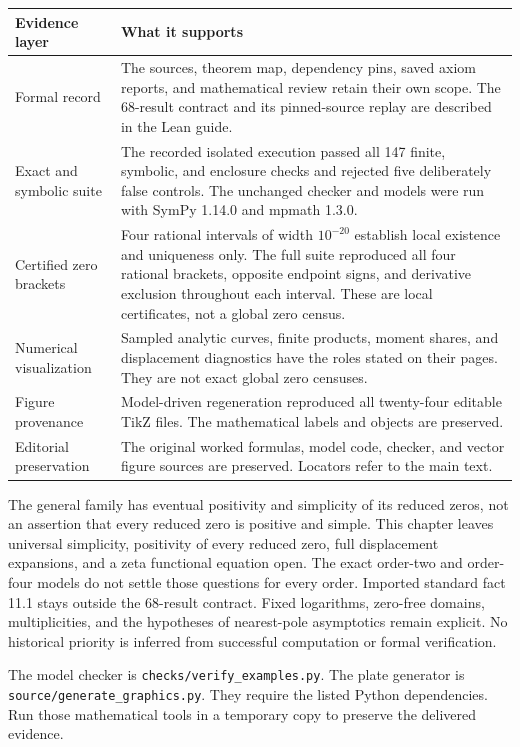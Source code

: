 {\small
\begin{tabularx}{\linewidth}{@{}p{.24\linewidth}Y@{}}\toprule
\textbf{Evidence layer} & \textbf{What it supports}\\\midrule
Formal record & The sources, theorem map, dependency pins, saved axiom reports, and mathematical review retain their own scope. The 68-result contract and its pinned-source replay are described in the Lean guide.\\
Exact and symbolic suite & The recorded isolated execution passed all 147 finite, symbolic, and enclosure checks and rejected five deliberately false controls. The unchanged checker and models were run with SymPy 1.14.0 and mpmath 1.3.0.\\
Certified zero brackets & Four rational intervals of width $10^{-20}$ establish local existence and uniqueness only. The full suite reproduced all four rational brackets, opposite endpoint signs, and derivative exclusion throughout each interval. These are local certificates, not a global zero census.\\
Numerical visualization & Sampled analytic curves, finite products, moment shares, and displacement diagnostics have the roles stated on their pages. They are not exact global zero censuses.\\
Figure provenance & Model-driven regeneration reproduced all twenty-four editable TikZ files. The mathematical labels and objects are preserved.\\
Editorial preservation & The original worked formulas, model code, checker, and vector figure sources are preserved. Locators refer to the main text.\\\bottomrule
\end{tabularx}}

The general family has eventual positivity and simplicity of its reduced zeros, not an assertion that every reduced zero is positive and simple. This chapter leaves universal simplicity, positivity of every reduced zero, full displacement expansions, and a zeta functional equation open. The exact order-two and order-four models do not settle those questions for every order.
Imported standard fact 11.1 stays outside the 68-result contract. Fixed logarithms, zero-free domains, multiplicities, and the hypotheses of nearest-pole asymptotics remain explicit. No historical priority is inferred from successful computation or formal verification.

The model checker is \texttt{checks/verify\_examples.py}. The plate generator is \texttt{source/generate\_graphics.py}. They require the listed Python dependencies. Run those mathematical tools in a temporary copy to preserve the delivered evidence.

